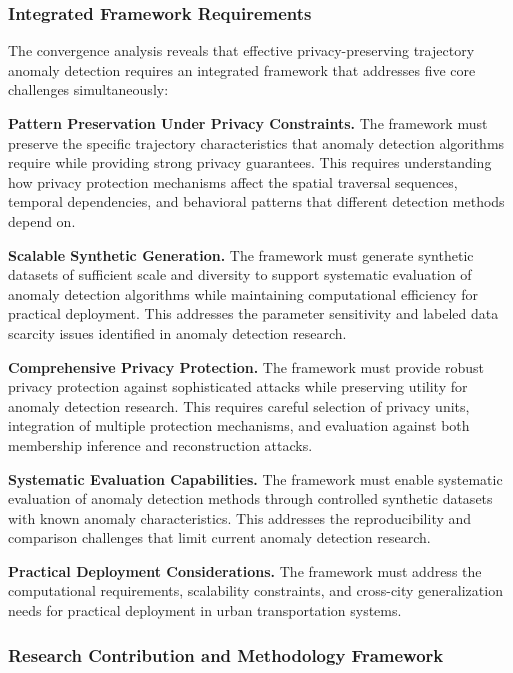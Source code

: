 \documentclass[runningheads]{llncs}
\begin{document}
\subsubsection{Integrated Framework Requirements}

The convergence analysis reveals that effective privacy-preserving trajectory anomaly detection requires an integrated framework that addresses five core challenges simultaneously:

\textbf{Pattern Preservation Under Privacy Constraints.} The framework must preserve the specific trajectory characteristics that anomaly detection algorithms require while providing strong privacy guarantees. This requires understanding how privacy protection mechanisms affect the spatial traversal sequences, temporal dependencies, and behavioral patterns that different detection methods depend on.

\textbf{Scalable Synthetic Generation.} The framework must generate synthetic datasets of sufficient scale and diversity to support systematic evaluation of anomaly detection algorithms while maintaining computational efficiency for practical deployment. This addresses the parameter sensitivity and labeled data scarcity issues identified in anomaly detection research.

\textbf{Comprehensive Privacy Protection.} The framework must provide robust privacy protection against sophisticated attacks while preserving utility for anomaly detection research. This requires careful selection of privacy units, integration of multiple protection mechanisms, and evaluation against both membership inference and reconstruction attacks.

\textbf{Systematic Evaluation Capabilities.} The framework must enable systematic evaluation of anomaly detection methods through controlled synthetic datasets with known anomaly characteristics. This addresses the reproducibility and comparison challenges that limit current anomaly detection research.

\textbf{Practical Deployment Considerations.} The framework must address the computational requirements, scalability constraints, and cross-city generalization needs for practical deployment in urban transportation systems.

\subsubsection{Research Contribution and Methodology Framework}
\end{document}
